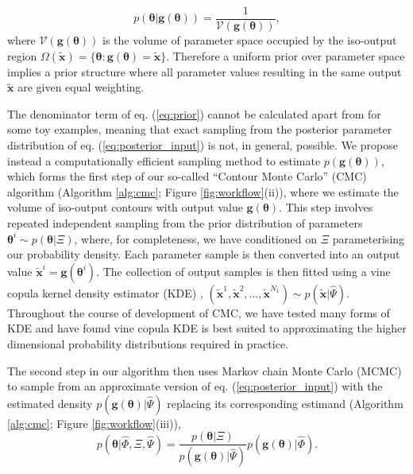 \documentclass[10pt,letterpaper]{article}
\begin{document}
%
\begin{equation}\label{eq:contour_volume}
p(\boldsymbol{\theta}|\boldsymbol{g}(\boldsymbol{\theta})) = \frac{1}{\mathcal{V}(\boldsymbol{g}(\boldsymbol{\theta}))},
\end{equation}
%
where $\mathcal{V}(\boldsymbol{g}(\boldsymbol{\theta}))$ is the volume of parameter space occupied by the iso-output region $\Omega(\tilde{\boldsymbol{x}}) = \{\boldsymbol{\theta}: \boldsymbol{g}(\boldsymbol{\theta}) = \tilde{\boldsymbol{x}}\}$. Therefore a uniform prior over parameter space implies a prior structure where all  parameter values resulting in the same output $\tilde{\boldsymbol{x}}$ are given equal weighting.

The denominator term of eq. (\ref{eq:prior}) cannot be calculated apart from for some toy examples, meaning that exact sampling from the posterior parameter distribution of eq. (\ref{eq:posterior_input}) is not, in general, possible. We propose instead a computationally efficient sampling method to estimate $p(\boldsymbol{g}(\boldsymbol{\theta}))$, which forms the first step of our so-called ``Contour Monte Carlo'' (CMC) algorithm (Algorithm \ref{alg:cmc}; Figure \ref{fig:workflow}(ii)), where we estimate the volume of iso-output contours with output value $\boldsymbol{g}(\boldsymbol{\theta})$. This step involves repeated independent sampling from the prior distribution of parameters $\boldsymbol{\theta}^i\sim p(\boldsymbol{\theta}|\Xi)$, where, for completeness, we have conditioned on $\Xi$ parameterising our probability density. Each parameter sample is then converted into an output value $\tilde{\boldsymbol{x}}^i=\boldsymbol{g}(\boldsymbol{\theta}^i)$. The collection of output samples is then fitted using a vine copula kernel density estimator (KDE) \cite{nagler2016evading}, $(\tilde{\boldsymbol{x}}^1,\tilde{\boldsymbol{x}}^2,...,\tilde{\boldsymbol{x}}^{N_1})\sim p(\tilde{\boldsymbol{x}}|\hat{\Psi})$. Throughout the course of development of CMC, we have tested many forms of KDE and have found vine copula KDE is best suited to approximating the higher dimensional probability distributions required in practice.

The second step in our algorithm then uses Markov chain Monte Carlo (MCMC) to sample from an approximate version of eq. (\ref{eq:posterior_input}) with the estimated density $p(\boldsymbol{g}(\boldsymbol{\theta})|\hat{\Psi})$ replacing its corresponding estimand (Algorithm \ref{alg:cmc}; Figure \ref{fig:workflow}(iii)),
%
\begin{equation}\label{eq:posterior_input_estimated}
p(\boldsymbol{\theta}|\hat{\Phi},\Xi,\hat{\Psi}) = \frac{p(\boldsymbol{\theta}|\Xi)}{p(\boldsymbol{g}(\boldsymbol{\theta})|\hat{\Psi})} p(\boldsymbol{g}(\boldsymbol{\theta})|\hat{\Phi}).
\end{equation}
%
\end{document}
